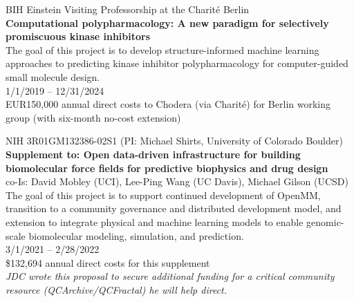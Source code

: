 \documentclass[10pt]{article}
\begin{document}

\vspace{1.5ex}

BIH Einstein Visiting Professorship at the Charit\'{e} Berlin\\
{\bf Computational polypharmacology: A new paradigm for selectively promiscuous kinase inhibitors}\\
The goal of this project is to develop structure-informed machine learning approaches to predicting kinase inhibitor polypharmacology for computer-guided small molecule design.\\
1/1/2019 -- 12/31/2024\\
EUR150,000 annual direct costs to Chodera (via Charit\'{e}) for Berlin working group (with six-month no-cost extension)

%

\vspace{1.5ex}

NIH 3R01GM132386-02S1 (PI: Michael Shirts, University of Colorado Boulder)\\
{\bf Supplement to: Open data-driven infrastructure for building biomolecular force fields for predictive biophysics and drug design}\\
co-Is: David Mobley (UCI), Lee-Ping Wang (UC Davis), Michael Gilson (UCSD) \\
The goal of this project is to support continued development of OpenMM, transition to a community governance and distributed development model, and extension to integrate physical and machine learning models to enable genomic-scale biomolecular modeling, simulation, and prediction.\\
3/1/2021 -- 2/28/2022\\
\$132,694 annual direct costs for this supplement\\
\emph{JDC wrote this proposal to secure additional funding for a critical community resource (QCArchive/QCFractal) he will help direct.}
\end{document}
